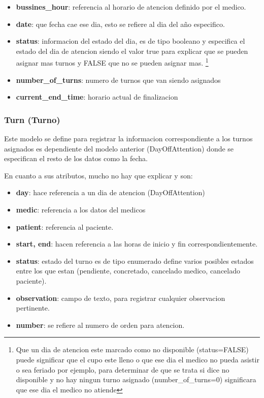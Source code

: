\begin{itemize}
    \item \textbf{bussines\_hour}: referencia al horario de atencion definido 
        por el medico.
    \item \textbf{date}: que fecha cae ese dia, esto se refiere al dia del a\~no 
        especifico.
    \item \textbf{status}: informacion del estado del dia, es de tipo booleano
        y especifica el estado del dia de atencion siendo el valor true 
        para explicar que se pueden asignar mas turnos y FALSE que no se 
        pueden asignar mas. \footnote{ Que un dia de atencion este marcado como 
        no disponible (status=FALSE) puede significar que el cupo este lleno o 
        que ese dia el medico no pueda asistir o sea feriado por ejemplo, para 
        determinar de que se trata si dice no disponible y no hay ningun turno 
        asignado (number\_of\_turns=0) significara que ese dia el medico no 
        atiende }
     \item \textbf{number\_of\_turns}: numero de turnos que van siendo asignados
     \item \textbf{current\_end\_time}: horario actual de finalizacion 
\end{itemize}


\subsubsection{Turn (Turno)}

Este modelo se define para registrar la informacion correspondiente a los 
turnos asignados es dependiente del modelo anterior (DayOffAttention) donde se 
especifican el resto de los datos como la fecha.

En cuanto a sus atributos, mucho no hay que explicar y son:

\begin{itemize}
    \item \textbf{day}: hace referencia a un dia de atencion (DayOffAttention)
    \item \textbf{medic}: referencia a los datos del medicos
    \item \textbf{patient}: referencia al paciente. 
    \item \textbf{start, end}: hacen referencia a las horas de inicio y fin 
        correspondientemente.
    \item \textbf{status}: estado del turno es de tipo enumerado define varios 
        posibles estados entre los que estan (pendiente, concretado, cancelado 
        medico, cancelado paciente).
    \item \textbf{observation}: campo de texto, para registrar cualquier 
        observacion pertinente.
    \item \textbf{number}: se refiere al numero de orden para atencion.
\end{itemize}


